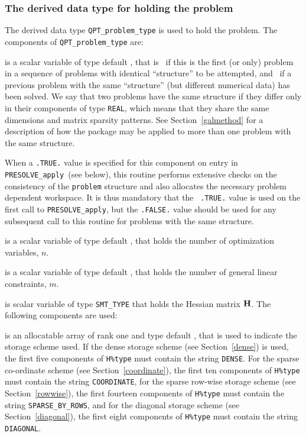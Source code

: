 \documentclass{galahad}
\newcommand{\packagename}{PRESOLVE}
\begin{document}

\subsubsection{The derived data type for holding the problem}\label{typeprob}
The derived data type {\tt QPT\_problem\_type} is used to hold 
the problem. The components of {\tt QPT\_problem\_type} 
are:

\begin{description}

 is a scalar variable of type default \logical, 
 that is \true\ if this is the first (or only) problem in a sequence of 
 problems with identical ``structure'' to be attempted, and \false\ if 
 a previous problem with the same ``structure'' (but different
 numerical data) has been solved. We say that two problems have the same
 structure if they differ only in their components of type {\tt REAL}, which
 means that they share the same dimensions and matrix sparsity patterns.
 See Section~\ref{galmethod} for a description of how the package may be
 applied to  more than one problem with the same structure.

\noindent
 When a {\tt .TRUE.} value is specified for this component on entry in {\tt
 \packagename\_apply}\ (see below), this routine performs extensive checks on
 the consistency of the {\tt problem} structure and also allocates the
 necessary problem dependent workspace.  It is thus mandatory that the {\tt
 .TRUE.} value is used on the first call to {\tt \packagename\_apply}, but
 the {\tt .FALSE.} value should be used for any subsequent call to this
 routine for problems with the same structure.

 is a scalar variable of type default \integer, 
 that holds the number of optimization variables, $n$.  
              
 is a scalar variable of type default \integer, 
 that holds the number of general linear constraints, $m$.
              
 is scalar variable of type {\tt SMT\_TYPE} 
that holds the Hessian matrix ${\mathbf{H}}$. The following components
are used:

\begin{description}

 is an allocatable array of rank one and type default \character, that
is used to indicate the storage scheme used. If the dense storage scheme 
(see Section~\ref{dense}) is used, 
the first five components of {\tt H\%type} must contain the
string {\tt DENSE}.
For the sparse co-ordinate scheme (see Section~\ref{coordinate}), 
the first ten components of {\tt H\%type} must contain the
string {\tt COORDINATE},  
for the sparse row-wise storage scheme (see Section~\ref{rowwise}),
the first fourteen components of {\tt H\%type} must contain the
string {\tt SPARSE\_BY\_ROWS},
and for the diagonal storage scheme (see Section~\ref{diagonal}),
the first eight components of {\tt H\%type} must contain the
string {\tt DIAGONAL}.


\end{description}
\end{description}
\end{document}
